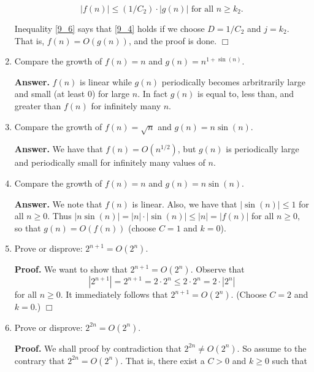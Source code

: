 \documentclass[9pt]{article}
\newcommand{\qed}{\hfill \ensuremath{\Box}}
\begin{document}
\begin{enumerate}
      \begin{equation} \label{9_6}
         |f(n)| \le (1/C_2) \cdot |g(n)| \text{ for all } n \ge k_2.
      \end{equation}

      Inequality \eqref{9_6} says that \eqref{9_4} holds if we choose
      $D = 1/C_2$ and $j = k_2$. That is, $f(n) = O(g(n))$, and the proof is
      done. \qed
   \item Compare the growth of $f(n) = n$ and $g(n) = n^{1+\sin(n)}$.

      \textbf{Answer.} $f(n)$ is linear while $g(n)$ periodically becomes
      arbritrarily large and small (at least 0) for large $n$. In fact $g(n)$ is
      equal to, less than, and greater than $f(n)$ for infinitely many $n$.
   \item Compare the growth of $f(n) = \sqrt{n}$ and $g(n) = n\sin(n)$.

      \textbf{Answer.} We have that $f(n) = O(n^{1/2})$, but $g(n)$ is
      periodically large and periodically small for infinitely many values of
      $n$.
   \item Compare the growth of $f(n) = n$ and $g(n) = n\sin(n)$.

      \textbf{Answer.} We note that $f(n)$ is linear. Also, we have that
      $|\sin(n)| \le 1$ for all $n \ge 0$. Thus
      $|n\sin(n)| = |n| \cdot |\sin(n)| \le |n| = |f(n)|$ for all $n \ge 0$,
      so that $g(n) = O(f(n))$ (choose $C = 1$ and $k = 0$).
   \item Prove or disprove: $2^{n+1} = O(2^n)$.

      \textbf{Proof.} We want to show that $2^{n+1} = O(2^n)$. Observe that
      $$|2^{n+1}| = 2^{n+1} = 2 \cdot 2^n \le 2 \cdot 2^n = 2 \cdot |2^n|$$
      for all $n \ge 0$. It immediately follows that $2^{n+1} = O(2^n)$.
      (Choose $C = 2$ and $k = 0$.) \qed
   \item Prove or disprove: $2^{2n} = O(2^n)$.

      \textbf{Proof.} We shall proof by contradiction that $2^{2n} \neq O(2^n)$.
      So assume to the contrary that $2^{2n} = O(2^n)$. That is, there exist a
      $C > 0$ and $k \ge 0$ such that


\end{enumerate}
\end{document}
